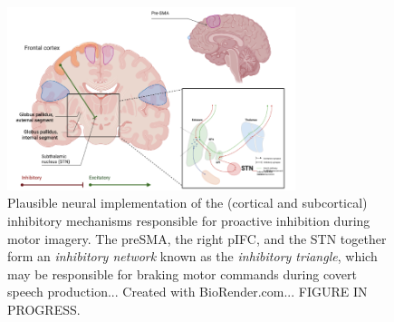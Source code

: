 \documentclass[utf8]{template/frontiersSCNS} %
\begin{document}

\begin{figure}[ht] %
\begin{center}
\includegraphics[width=0.75\textwidth]{figures/inhibitory_triangle.png} %
\end{center}
\caption{Plausible neural implementation of the (cortical and subcortical) inhibitory mechanisms responsible for proactive inhibition during motor imagery. The preSMA, the right pIFC, and the STN together form an \textit{inhibitory network} known as the \textit{inhibitory triangle}, which may be responsible for braking motor commands during covert speech production... Created with BioRender.com... FIGURE IN PROGRESS.}\label{fig:2}
\end{figure}

\end{document}
